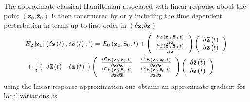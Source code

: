 \documentclass[aps,preprint]{revtex4}%
\begin{document}
The approximate classical Hamiltonian associated with linear response about
the point $\left(  \mathbf{z}_{0},\mathbf{\bar{z}}_{0}\right)  $ is then
constructed by only including the time dependent perturbation in terms up to
first order in $\left(  \delta\mathbf{z},\delta\mathbf{\bar{z}}\right)  $
\begin{align}
&  E_{2}\left[  \mathbf{z}_{0}\right]  \left(  \delta\mathbf{z}\left(
t\right)  ,\delta\mathbf{\bar{z}}\left(  t\right)  ,t\right)  =E_{0}\left(
\mathbf{z}_{0},\mathbf{\bar{z}}_{0},t\right)  +\left(
\begin{array}
[c]{c}%
\frac{\partial E\left(  \mathbf{z}_{0},\mathbf{\bar{z}}_{0},t\right)
}{\partial\mathbf{\bar{z}}}\\
\frac{\partial E\left(  \mathbf{z}_{0},\mathbf{\bar{z}}_{0},t\right)
}{\partial\mathbf{z}}%
\end{array}
\right)  \left(
\begin{array}
[c]{c}%
\delta\mathbf{\bar{z}}\left(  t\right) \\
\delta\mathbf{z}\left(  t\right)
\end{array}
\right) \nonumber\\
&  +\frac{1}{2}\left(
\begin{array}
[c]{cc}%
\delta\mathbf{\bar{z}}\left(  t\right)  & \delta\mathbf{z}\left(  t\right)
\end{array}
\right)  \left(
\begin{array}
[c]{cc}%
\frac{\partial^{2}E\left(  \mathbf{z}_{0},\mathbf{\bar{z}}_{0},t\right)
}{\partial\mathbf{\bar{z}}\partial\mathbf{\bar{z}}} & \frac{\partial
^{2}E\left(  \mathbf{z}_{0},\mathbf{\bar{z}}_{0},t\right)  }{\partial
\mathbf{\bar{z}}\partial\mathbf{z}}\\
\frac{\partial^{2}E\left(  \mathbf{z}_{0},\mathbf{\bar{z}}_{0},t\right)
}{\partial\mathbf{z}\partial\mathbf{\bar{z}}} & \frac{\partial^{2}E\left(
\mathbf{z}_{0},\mathbf{\bar{z}}_{0},t\right)  }{\partial\mathbf{z}%
\partial\mathbf{z}}%
\end{array}
\right)  \left(
\begin{array}
[c]{c}%
\delta\mathbf{\bar{z}}\left(  t\right) \\
\delta\mathbf{z}\left(  t\right)
\end{array}
\right)
\end{align}
using the linear response approximation one obtains an approximate gradient
for local variations as
\end{document}

